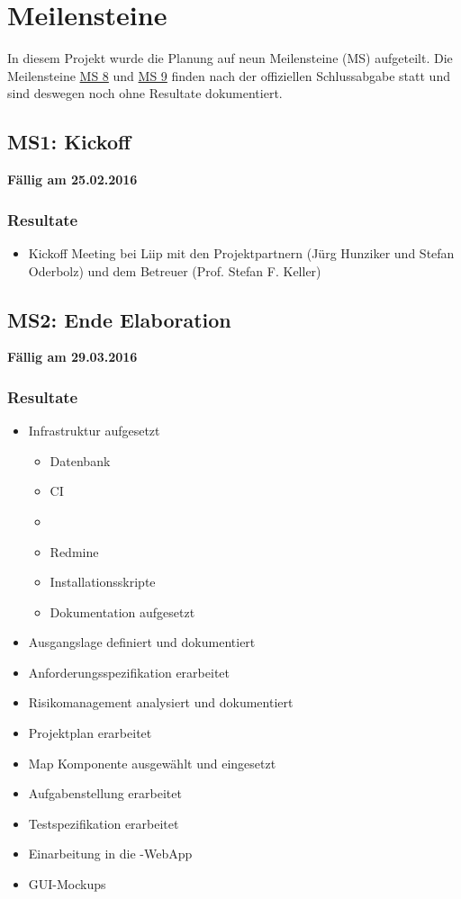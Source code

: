 \section{Meilensteine}
\label{pm-meilensteine}

In diesem Projekt wurde die Planung auf neun Meilensteine (MS) aufgeteilt. 
Die Meilensteine \hyperref[pm-ms8]{MS 8} und \hyperref[pm-ms9]{MS 9} finden nach der offiziellen Schlussabgabe statt und sind deswegen noch ohne Resultate dokumentiert.

\subsection{MS1: Kickoff}
\label{pm-ms1}
\textbf{Fällig am 25.02.2016}
\subsubsection{Resultate}
\begin{itemize}
	\item Kickoff Meeting bei Liip mit den Projektpartnern (Jürg Hunziker und Stefan Oderbolz) und dem Betreuer (Prof. Stefan F. Keller)
\end{itemize}

\subsection{MS2: Ende Elaboration}
\label{pm-ms2}
\textbf{Fällig am 29.03.2016}
\subsubsection{Resultate}
\begin{itemize}
	\item Infrastruktur aufgesetzt
	\begin{itemize}
		\item Datenbank
		\item \gls{CI}
		\item {}
		\item Redmine
		\item Installationsskripte
		\item Dokumentation aufgesetzt
	\end{itemize}
	\item Ausgangslage definiert und dokumentiert
	\item Anforderungsspezifikation erarbeitet
	\item Risikomanagement analysiert und dokumentiert
	\item Projektplan erarbeitet
	\item Map Komponente ausgewählt und eingesetzt
	\item Aufgabenstellung erarbeitet
	\item Testspezifikation erarbeitet
	\item Einarbeitung in die \kort{}-\gls{WebApp}
	\item \gls{GUI}-Mockups
\end{itemize}


